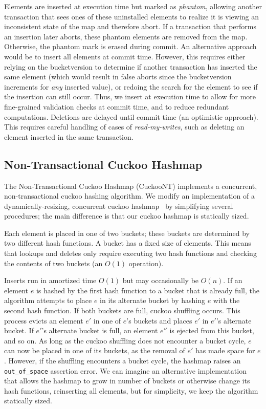 Elements are inserted at execution time but marked as \emph{phantom}, allowing another transaction that sees ones of these uninstalled elements to realize it is viewing an inconsistent state of the map and therefore abort. If a transaction that performs an insertion later aborts, these phantom elements are removed from the map. Otherwise, the phantom mark is erased during commit. An alternative approach would be to insert all elements at commit time. However, this requires either relying on the bucketversion to determine if another transaction has inserted the same element (which would result in false aborts since the bucketversion increments for \emph{any} inserted value), or redoing the search for the element to see if the insertion can still occur. Thus, we insert at execution time to allow for more fine-grained validation checks at commit time, and to reduce redundant computations. Deletions are delayed until commit time (an optimistic approach). This requires careful handling of cases of \emph{read-my-writes}, such as deleting an element inserted in the same transaction.

\subsection{Non-Transactional Cuckoo Hashmap}
The Non-Transactional Cuckoo Hashmap (CuckooNT) implements a concurrent, non-transactional cuckoo hashing algorithm. We modify an implementation of a dynamically-resizing, concurrent cuckoo hashmap~\cite{cuckoocode} by simplifying several procedures; the main difference is that our cuckoo hashmap is statically sized.

Each element is placed in one of two buckets; these buckets are determined by two different hash functions. A bucket has a fixed size of elements. This means that lookups and deletes only require executing two hash functions and checking the contents of two buckets (an $O(1)$ operation).

Inserts run in amortized time $O(1)$ but may occasionally be $O(n)$.
If an element $e$ is hashed by the first hash function to a bucket that is already full, the algorithm attempts to place $e$ in its alternate bucket by hashing $e$ with the second hash function. If both buckets are full, cuckoo shuffling occurs. This process evicts an element $e'$ in one of $e$'s buckets and places $e'$ in $e'$'s alternate bucket. If $e'$'s alternate bucket is full, an element $e''$ is ejected from this bucket, and so on. As long as the cuckoo shuffling does not encounter a bucket cycle, $e$ can now be placed in one of its buckets, as the removal of $e'$ has made space for $e$.
However, if the shuffling encounters a bucket cycle, the hashmap raises an \texttt{{out\_of\_space}} assertion error. We can imagine an alternative implementation that allows the hashmap to grow in number of buckets or otherwise change its hash functions, reinserting all elements, but for simplicity, we keep the algorithm statically sized.

